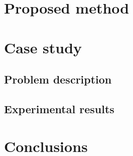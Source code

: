 \documentclass[
]{article}
\begin{document}
\section{Proposed method}\label{proposed-method}

\section{Case study}\label{case-study}

\subsection{Problem description}\label{problem-description}

\subsection{Experimental results}\label{experimental-results}

\section{Conclusions}\label{conclusions}
\end{document}
